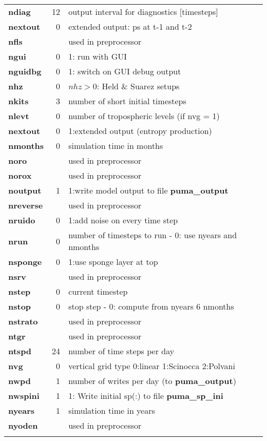 \begin{tabular}{|l|r|l|}
{\bf ndiag   } & 12 & output interval for diagnostics [timesteps] \\   
{\bf nextout } &  0 & extended output: ps at t-1 and t-2 \\
{\bf nfls    } &    & used in preprocessor \\
{\bf ngui    } &  0 & 1: run with GUI \\
{\bf nguidbg } &  0 & 1: switch on GUI debug output \\
{\bf nhz     } &  0 & $nhz > 0$: Held \& Suarez setups \\
{\bf nkits   } &  3 & number of short initial timesteps \\       
{\bf nlevt   } &  0 & number of tropospheric levels (if nvg = 1) \\
{\bf nextout } &  0 & 1:extended output (entropy production) \\
{\bf nmonths } &  0 & simulation time in months \\
{\bf noro    } &    & used in preprocessor \\
{\bf norox   } &    & used in preprocessor \\
{\bf noutput } &  1 & 1:write model output to file {\bf puma\_output} \\
{\bf nreverse} &    & used in preprocessor \\
{\bf nruido  } &  0 & 1:add noise on every time step \\
{\bf nrun    } &  0 & number of timesteps to run - 0: use nyears and nmonths \\
{\bf nsponge } &  0 & 1:use sponge layer at top \\
{\bf nsrv    } &    & used in preprocessor \\
{\bf nstep   } &  0 & current timestep \\
{\bf nstop   } &  0 & stop step - 0: compute from nyears 6 nmonths \\
{\bf nstrato } &    & used in preprocessor \\
{\bf ntgr    } &    & used in preprocessor \\
{\bf ntspd   } & 24 & number of time steps per day  \\         
{\bf nvg     } &  0 & vertical grid type 0:linear 1:Scinocca 2:Polvani \\
{\bf nwpd    } &  1 & number of writes per day (to {\bf puma\_output}) \\
{\bf nwspini } &  1 & 1: Write initial sp(:) to file {\bf puma\_sp\_ini}\\
{\bf nyears  } &  1 & simulation time in years  \\
{\bf nyoden  } &    & used in preprocessor \\
& & \\
\hline                                                        
\end{tabular}
\newpage

